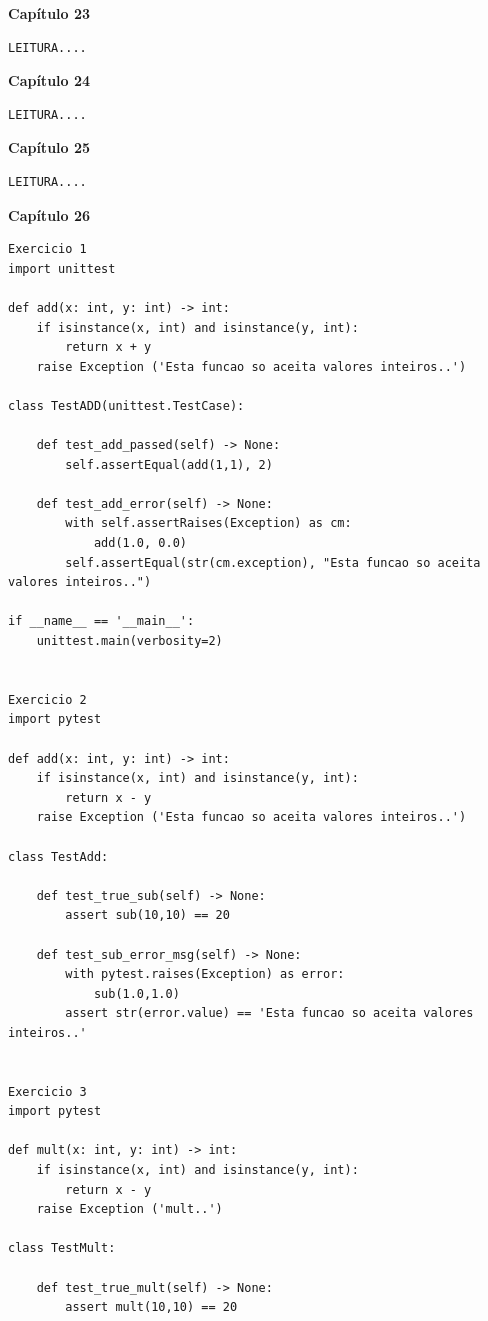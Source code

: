 \documentclass[a4paper,12pt]{article}
\newcommand{\capitulo}[1]{
    \vspace{1em}
    \noindent
    \colorbox{black!15}{
        \parbox{\dimexpr\linewidth-2\fboxsep}{
            \centering \Large \textbf{#1}
        }
    }
    \vspace{1em}
}
\begin{document}
\capitulo{Capítulo 23}
\begin{lstlisting}[style=pythonstyle]
LEITURA....
\end{lstlisting}

\capitulo{Capítulo 24}
\begin{lstlisting}[style=pythonstyle]
LEITURA....
\end{lstlisting}

\capitulo{Capítulo 25}
\begin{lstlisting}[style=pythonstyle]
LEITURA....
\end{lstlisting}

\capitulo{Capítulo 26}
\begin{lstlisting}[style=pythonstyle]
Exercicio 1
import unittest

def add(x: int, y: int) -> int:
    if isinstance(x, int) and isinstance(y, int):
        return x + y
    raise Exception ('Esta funcao so aceita valores inteiros..')

class TestADD(unittest.TestCase):

    def test_add_passed(self) -> None:
        self.assertEqual(add(1,1), 2)

    def test_add_error(self) -> None:
        with self.assertRaises(Exception) as cm:
            add(1.0, 0.0)
        self.assertEqual(str(cm.exception), "Esta funcao so aceita valores inteiros..")

if __name__ == '__main__':
    unittest.main(verbosity=2)


Exercicio 2
import pytest 

def add(x: int, y: int) -> int:
    if isinstance(x, int) and isinstance(y, int):
        return x - y
    raise Exception ('Esta funcao so aceita valores inteiros..')

class TestAdd:

    def test_true_sub(self) -> None:
        assert sub(10,10) == 20

    def test_sub_error_msg(self) -> None:
        with pytest.raises(Exception) as error:
            sub(1.0,1.0)
        assert str(error.value) == 'Esta funcao so aceita valores inteiros..'


Exercicio 3
import pytest 

def mult(x: int, y: int) -> int:
    if isinstance(x, int) and isinstance(y, int):
        return x - y
    raise Exception ('mult..')

class TestMult:

    def test_true_mult(self) -> None:
        assert mult(10,10) == 20


\end{lstlisting}
\end{document}
